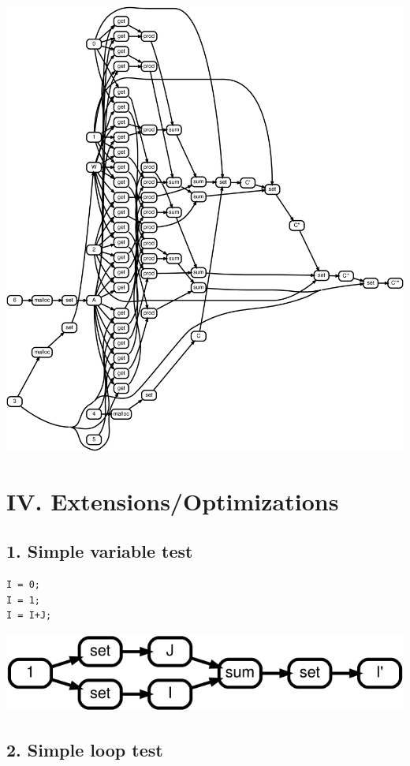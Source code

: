 \documentclass[sigplan,10pt,review,anonymous]{acmart}
\begin{document}
\includegraphics[scale=0.05]{rtd34}

\section*{IV. Extensions/Optimizations}

\subsection*{1. Simple variable test}

\begin{lstlisting}
I = 0;
I = 1;
I = I+J;
\end{lstlisting}

\includegraphics[scale=0.1]{rtd41}

\subsection*{2. Simple loop test}
\end{document}
